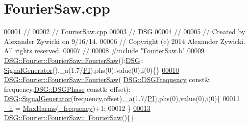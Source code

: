 \hypertarget{_fourier_saw_8cpp_source}{\section{Fourier\+Saw.\+cpp}
\label{_fourier_saw_8cpp_source}
}

\begin{DoxyCode}
00001 \textcolor{comment}{//}
00002 \textcolor{comment}{//  FourierSaw.cpp}
00003 \textcolor{comment}{//  DSG}
00004 \textcolor{comment}{//}
00005 \textcolor{comment}{//  Created by Alexander Zywicki on 9/16/14.}
00006 \textcolor{comment}{//  Copyright (c) 2014 Alexander Zywicki. All rights reserved.}
00007 \textcolor{comment}{//}
00008 \textcolor{preprocessor}{#include "\hyperlink{_fourier_saw_8h}{FourierSaw.h}"}
\hypertarget{_fourier_saw_8cpp_source_l00009}{}\hyperlink{class_d_s_g_1_1_fourier_1_1_fourier_saw_acfef03c4384ef656110c51102e346c49}{00009} \hyperlink{class_d_s_g_1_1_fourier_1_1_fourier_saw_acfef03c4384ef656110c51102e346c49}{DSG::Fourier::FourierSaw::FourierSaw}():\hyperlink{namespace_d_s_g}{DSG}::
      \hyperlink{class_d_s_g_1_1_signal_generator}{SignalGenerator}(),\_a(1.7/\hyperlink{_p_i_8h_a598a3330b3c21701223ee0ca14316eca}{PI}),phs(0),value(0),i(0)\{\}
\hypertarget{_fourier_saw_8cpp_source_l00010}{}\hyperlink{class_d_s_g_1_1_fourier_1_1_fourier_saw_a6062c388900f32e1cfd6df95b9760065}{00010} \hyperlink{class_d_s_g_1_1_fourier_1_1_fourier_saw_acfef03c4384ef656110c51102e346c49}{DSG::Fourier::FourierSaw::FourierSaw}(
      \hyperlink{namespace_d_s_g_a4315a061386fa1014fda09b15d3a6973}{DSG::DSGFrequency} \textcolor{keyword}{const}& frequency,\hyperlink{namespace_d_s_g_a44431ce1eb0a7300efdd207bc879e52c}{DSG::DSGPhase} \textcolor{keyword}{const}& offset):
      \hyperlink{namespace_d_s_g}{DSG}::\hyperlink{class_d_s_g_1_1_signal_generator}{SignalGenerator}(frequency,offset),\_a(1.7/\hyperlink{_p_i_8h_a598a3330b3c21701223ee0ca14316eca}{PI}),phs(0),value(0),i(0)\{
00011     \hyperlink{class_d_s_g_1_1_fourier_1_1_fourier_saw_a78d30240b7eb99fcb249b5aafe3d55b2}{\_h} = \hyperlink{namespace_d_s_g_ab5c4eea42ea10b69cfc32afb83ff1d0d}{MaxHarms}(\hyperlink{class_d_s_g_1_1_signal_generator_a335e7ef058848eca368be51d8544d143}{\_frequency})+1;
00012 \}
\hypertarget{_fourier_saw_8cpp_source_l00013}{}\hyperlink{class_d_s_g_1_1_fourier_1_1_fourier_saw_acd28c4942553271ed9f39e8f05b8db6d}{00013} \hyperlink{class_d_s_g_1_1_fourier_1_1_fourier_saw_acd28c4942553271ed9f39e8f05b8db6d}{DSG::Fourier::FourierSaw::~FourierSaw}()\{\}
\end{DoxyCode}
